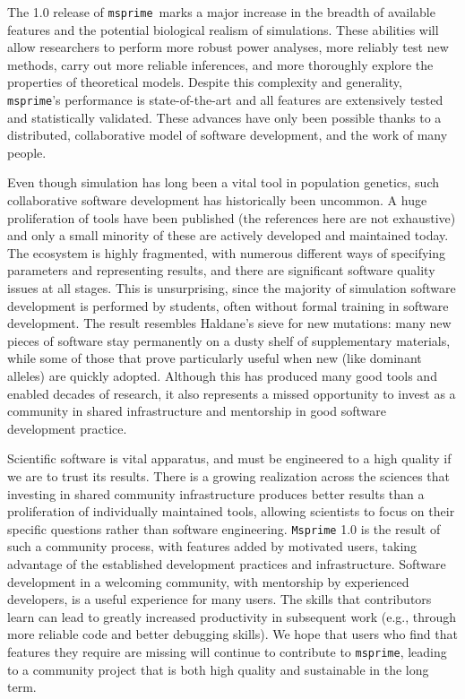 \documentclass[9pt,twocolumn,twoside,lineno]{gsajnl}
\newcommand{\msprime}[0]{\texttt{msprime}}
\begin{document}
The 1.0 release of \msprime\ marks a major increase in the
breadth of available features and the
potential biological realism of simulations.
These abilities will allow researchers to perform more robust power analyses,
more reliably test new methods,
carry out more reliable inferences,
and more thoroughly explore the properties of theoretical models.
Despite this complexity and generality,
\msprime's performance is state-of-the-art
and all features are extensively tested and statistically validated.
These advances have only been possible thanks to a distributed,
collaborative model of software development,
and the work of many people.


Even though simulation has long been a vital tool in population genetics,
such collaborative software development has historically been uncommon.
A huge proliferation of tools have been published
(the references here are not exhaustive)
and only a small minority of these are actively developed and
maintained today. The ecosystem is highly fragmented, with numerous different
ways of specifying parameters and representing results, and there are
significant software quality issues at all stages. This is unsurprising, since
the majority of simulation software development is performed by students,
often without formal training in software development.
The result resembles Haldane's sieve for new mutations:
many new pieces of software stay permanently on a dusty shelf of supplementary materials,
while some of those that prove particularly useful when new (like dominant alleles)
are quickly adopted.
Although this has produced many good tools
and enabled decades of research,
it also represents a missed opportunity to invest as a community
in shared infrastructure and mentorship in good software development practice.

Scientific software is vital apparatus, and must be engineered
to a high quality if we are to trust its results. There is a growing
realization across the sciences
\citep[e.g.][]{siepel2019challenges,harris2020array,gardner2021sustained}
that investing in
shared community infrastructure produces better results than a
proliferation of individually maintained tools, allowing scientists
to focus on their specific questions rather than software engineering.
\texttt{Msprime} 1.0 is the result of such a community process,
with features added by motivated users, taking advantage of the
established development practices and infrastructure.
Software development in a welcoming community,
with mentorship by experienced developers,
is a useful experience for many users.
The skills that contributors learn
can lead to greatly increased productivity in subsequent
work (e.g., through more reliable code and better debugging skills).
We hope that users who find that
features they require are missing will continue to contribute to
\msprime, leading to a community project that is both high quality
and sustainable in the long term.
\end{document}
